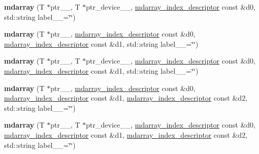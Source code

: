 \begin{DoxyCompactItemize}
\item 
\hypertarget{classsddk_1_1mdarray_aa0171d79c75679646ce2ce61ef668ec8}{}{\bfseries mdarray} (T $\ast$ptr\+\_\+\+\_\+, T $\ast$ptr\+\_\+device\+\_\+\+\_\+, \hyperlink{classsddk_1_1mdarray__index__descriptor}{mdarray\+\_\+index\+\_\+descriptor} const \&d0, std\+::string label\+\_\+\+\_\+=\char`\"{}\char`\"{})\label{classsddk_1_1mdarray_aa0171d79c75679646ce2ce61ef668ec8}

\item 
\hypertarget{classsddk_1_1mdarray_a48e6d32629a2e6c0bbf8ed9afe6596cc}{}{\bfseries mdarray} (T $\ast$ptr\+\_\+\+\_\+, \hyperlink{classsddk_1_1mdarray__index__descriptor}{mdarray\+\_\+index\+\_\+descriptor} const \&d0, \hyperlink{classsddk_1_1mdarray__index__descriptor}{mdarray\+\_\+index\+\_\+descriptor} const \&d1, std\+::string label\+\_\+\+\_\+=\char`\"{}\char`\"{})\label{classsddk_1_1mdarray_a48e6d32629a2e6c0bbf8ed9afe6596cc}

\item 
\hypertarget{classsddk_1_1mdarray_a297778e5ed9b4bfccbac1f70ed2cb7b6}{}{\bfseries mdarray} (T $\ast$ptr\+\_\+\+\_\+, T $\ast$ptr\+\_\+device\+\_\+\+\_\+, \hyperlink{classsddk_1_1mdarray__index__descriptor}{mdarray\+\_\+index\+\_\+descriptor} const \&d0, \hyperlink{classsddk_1_1mdarray__index__descriptor}{mdarray\+\_\+index\+\_\+descriptor} const \&d1, std\+::string label\+\_\+\+\_\+=\char`\"{}\char`\"{})\label{classsddk_1_1mdarray_a297778e5ed9b4bfccbac1f70ed2cb7b6}

\item 
\hypertarget{classsddk_1_1mdarray_a2866d31de97a59cfd781f5a2efae7e8e}{}{\bfseries mdarray} (T $\ast$ptr\+\_\+\+\_\+, \hyperlink{classsddk_1_1mdarray__index__descriptor}{mdarray\+\_\+index\+\_\+descriptor} const \&d0, \hyperlink{classsddk_1_1mdarray__index__descriptor}{mdarray\+\_\+index\+\_\+descriptor} const \&d1, \hyperlink{classsddk_1_1mdarray__index__descriptor}{mdarray\+\_\+index\+\_\+descriptor} const \&d2, std\+::string label\+\_\+\+\_\+=\char`\"{}\char`\"{})\label{classsddk_1_1mdarray_a2866d31de97a59cfd781f5a2efae7e8e}

\item 
\hypertarget{classsddk_1_1mdarray_a2606801b9940cff099c04373c25b9116}{}{\bfseries mdarray} (T $\ast$ptr\+\_\+\+\_\+, T $\ast$ptr\+\_\+device\+\_\+\+\_\+, \hyperlink{classsddk_1_1mdarray__index__descriptor}{mdarray\+\_\+index\+\_\+descriptor} const \&d0, \hyperlink{classsddk_1_1mdarray__index__descriptor}{mdarray\+\_\+index\+\_\+descriptor} const \&d1, \hyperlink{classsddk_1_1mdarray__index__descriptor}{mdarray\+\_\+index\+\_\+descriptor} const \&d2, std\+::string label\+\_\+\+\_\+=\char`\"{}\char`\"{})\label{classsddk_1_1mdarray_a2606801b9940cff099c04373c25b9116}


\end{DoxyCompactItemize}
